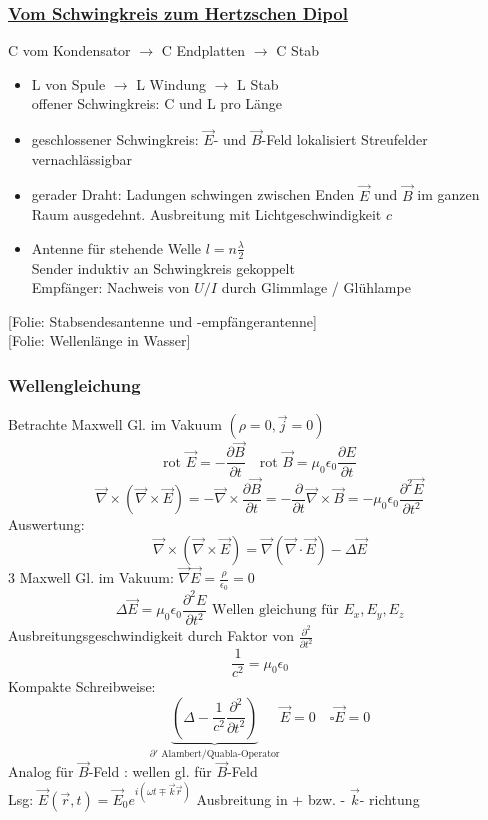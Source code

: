 \documentclass[titlepage,12pt,a4paper,ngerman]{report}
\newcommand{\tx}[1]{\textrm{#1}}
\newcommand{\ub}[1]{\underbrace{#1}}
\newcommand{\folie}[1]{\color{gray}[Folie: #1]\color{black}}
\begin{document}
\subsubsection{\underline{Vom Schwingkreis zum Hertzschen Dipol}}
C vom Kondensator $ \rightarrow $ C Endplatten $ \rightarrow $ C Stab\\
\begin{itemize}
	\item L von Spule $ \rightarrow $ L Windung $ \rightarrow $ L Stab\\
	offener Schwingkreis: C und L pro Länge
	\item geschlossener Schwingkreis: $ \vec{E} $- und $ \vec{B} $-Feld lokalisiert Streufelder vernachlässigbar
	\item gerader Draht: Ladungen schwingen zwischen Enden $ \vec{E} $ und $ \vec{B} $ im ganzen Raum ausgedehnt. Ausbreitung mit Lichtgeschwindigkeit $ c $
	\item Antenne für stehende Welle $ l =  n \frac{\lambda}{2} $\\
	Sender induktiv an Schwingkreis gekoppelt\\
	Empfänger: Nachweis von $ U/I $ durch Glimmlage / Glühlampe
\end{itemize}
\folie{Stabsendesantenne und -empfängerantenne}\\
\folie{Wellenlänge in Wasser}\\
\subsubsection{Wellengleichung}
Betrachte Maxwell Gl. im Vakuum $ (\rho = 0 , \vec{j} = 0) $
$$\tx{rot } \vec{E} = - \frac{\partial \vec{B}}{\partial t} \quad \tx{rot } \vec{B} = \mu_0 \epsilon_0 \frac{\partial E}{\partial t}$$
$$\vec{\nabla} \times(\vec{\nabla}\times \vec{E} ) = - \vec{\nabla} \times \frac{\partial \vec{B}}{\partial t} = - \frac{\partial }{\partial t} \vec{\nabla} \times \vec{B} = - \mu_0 \epsilon_0 \frac{\partial ^2 \vec{E}}{\partial t^2}$$
Auswertung:
$$\vec{\nabla} \times ( \vec{\nabla} \times \vec{E}) = \vec{\nabla} ( \vec{\nabla} \cdot \vec{E}) - \Delta \vec{E}$$
3 Maxwell Gl. im Vakuum: $\vec{\nabla} \vec{E} = \frac{\rho}{\epsilon_0} = 0$
$$\boxed{\Delta \vec{E}= \mu_0 \epsilon_0 \frac{\partial^2 E}{\partial t^2}} \tx{ Wellen gleichung für } E_x, E_y, E_z$$ 
Ausbreitungsgeschwindigkeit durch Faktor von $ \frac{\partial ^2}{\partial t^2} $
$$\boxed{\frac{1}{c^2} = \mu_0 \epsilon_0}$$
Kompakte Schreibweise: 
$$\ub{( \Delta - \frac{1}{c^2} \frac{\partial ^2}{\partial t^2} )}_{\partial' \tx{ Alambert/Quabla-Operator}} \vec{E} = 0 \quad \square \vec{E} = 0$$
Analog für $\vec{B}$-Feld :  wellen gl. für $\vec{B}$-Feld\\[5pt]
Lsg: $\vec{E}(\vec{r},t) = \vec{E}_0 e^{i (\omega t \mp \vec{k} \vec{r})}$ Ausbreitung in + bzw. - $\vec{k}$- richtung
\end{document}
